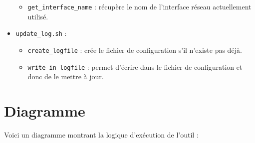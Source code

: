 \documentclass{article}
\begin{document}
\begin{itemize}
\begin{itemize}[label=\textbullet]
            \item \texttt{get\_interface\_name} : récupère le nom de l'interface réseau actuellement utilisé.
        \end{itemize}
        \vspace{0.3em}
    \item \texttt{update\_log.sh} :
        \begin{itemize}[label=\textbullet]
            \item \texttt{create\_logfile} : crée le fichier de configuration s’il n’existe pas déjà.
            \item \texttt{write\_in\_logfile} : permet d’écrire dans le fichier de configuration et donc de le mettre à jour.
        \end{itemize}
\end{itemize}

\newpage
\section{Diagramme}

Voici un diagramme montrant la logique d'exécution de l'outil :
\vspace{1em}
  
\end{document}
